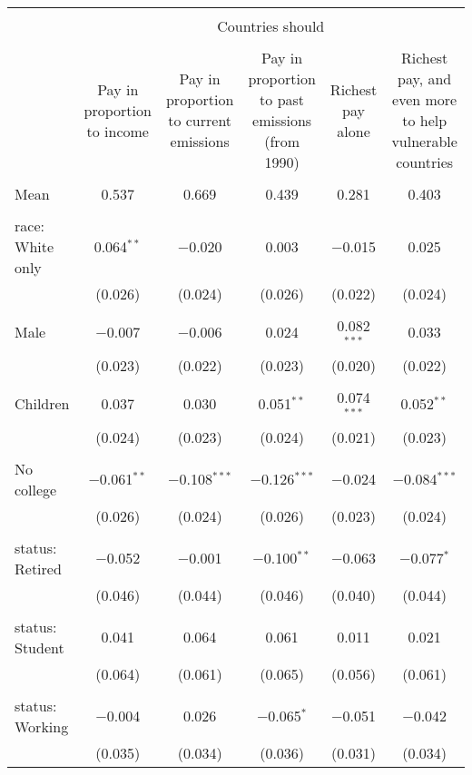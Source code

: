 
\begin{tabular}{@{\extracolsep{5pt}}lccccc} 
\\[-1.8ex]\hline 
\hline \\[-1.8ex] 
 & \multicolumn{5}{c}{Countries should} \\ 
\cline{2-6} 
\\[-1.8ex] & Pay in proportion to income & Pay in proportion to current emissions & Pay in proportion to past emissions (from 1990) & Richest pay alone & Richest pay, and even more to help vulnerable countries \\ 
\hline \\[-1.8ex] 
 Mean & 0.537 & 0.669 & 0.439 & 0.281 & 0.403  \\ \hline \\[-1.8ex] race: White only & 0.064$^{**}$ & $-$0.020 & 0.003 & $-$0.015 & 0.025 \\ 
  & (0.026) & (0.024) & (0.026) & (0.022) & (0.024) \\ 
  & & & & & \\ 
 Male & $-$0.007 & $-$0.006 & 0.024 & 0.082$^{***}$ & 0.033 \\ 
  & (0.023) & (0.022) & (0.023) & (0.020) & (0.022) \\ 
  & & & & & \\ 
 Children & 0.037 & 0.030 & 0.051$^{**}$ & 0.074$^{***}$ & 0.052$^{**}$ \\ 
  & (0.024) & (0.023) & (0.024) & (0.021) & (0.023) \\ 
  & & & & & \\ 
 No college & $-$0.061$^{**}$ & $-$0.108$^{***}$ & $-$0.126$^{***}$ & $-$0.024 & $-$0.084$^{***}$ \\ 
  & (0.026) & (0.024) & (0.026) & (0.023) & (0.024) \\ 
  & & & & & \\ 
 status: Retired & $-$0.052 & $-$0.001 & $-$0.100$^{**}$ & $-$0.063 & $-$0.077$^{*}$ \\ 
  & (0.046) & (0.044) & (0.046) & (0.040) & (0.044) \\ 
  & & & & & \\ 
 status: Student & 0.041 & 0.064 & 0.061 & 0.011 & 0.021 \\ 
  & (0.064) & (0.061) & (0.065) & (0.056) & (0.061) \\ 
  & & & & & \\ 
 status: Working & $-$0.004 & 0.026 & $-$0.065$^{*}$ & $-$0.051 & $-$0.042 \\ 
  & (0.035) & (0.034) & (0.036) & (0.031) & (0.034) \\ 

\end{tabular}
